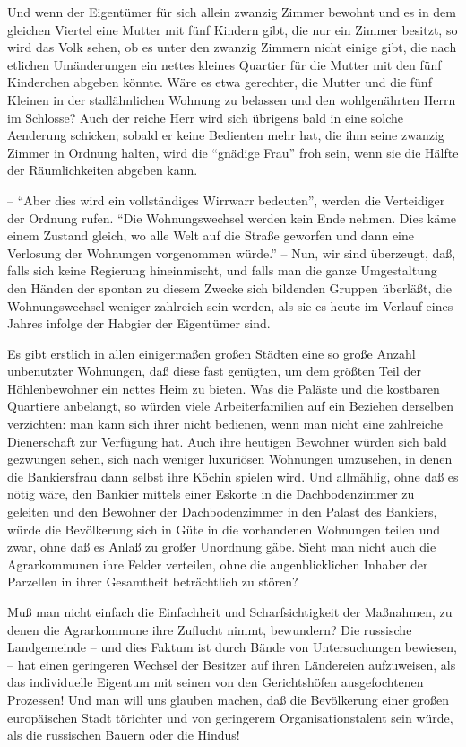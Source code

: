 \documentclass{scrbook}
\begin{document}
Und wenn der Eigentümer für sich allein zwanzig Zimmer bewohnt und es in dem gleichen Viertel eine Mutter mit fünf Kindern gibt, die nur ein Zimmer besitzt, so wird das Volk sehen, ob es unter den zwanzig Zimmern nicht einige gibt, die nach etlichen Umänderungen ein nettes kleines Quartier für die Mutter mit den fünf Kinderchen abgeben könnte. Wäre es etwa gerechter, die Mutter und die fünf Kleinen in der stallähnlichen Wohnung zu belassen und den wohlgenährten Herrn im Schlosse? Auch der reiche Herr wird sich übrigens bald in eine solche Aenderung schicken; sobald er keine Bedienten mehr hat, die ihm seine zwanzig Zimmer in Ordnung halten, wird die ``gnädige Frau'' froh sein, wenn sie die Hälfte der Räumlichkeiten abgeben kann.

– ``Aber dies wird ein vollständiges Wirrwarr bedeuten'', werden die Verteidiger der Ordnung rufen. ``Die Wohnungswechsel werden kein Ende nehmen. Dies käme einem Zustand gleich, wo alle Welt auf die Straße geworfen und dann eine Verlosung der Wohnungen vorgenommen würde.'' – Nun, wir sind überzeugt, daß, falls sich keine Regierung hineinmischt, und falls man die ganze Umgestaltung den Händen der spontan zu diesem Zwecke sich bildenden Gruppen überläßt, die Wohnungswechsel weniger zahlreich sein werden, als sie es heute im Verlauf eines Jahres infolge der Habgier der Eigentümer sind.

Es gibt erstlich in allen einigermaßen großen Städten eine so große Anzahl unbenutzter Wohnungen, daß diese fast genügten, um dem größten Teil der Höhlenbewohner ein nettes Heim zu bieten. Was die Paläste und die kostbaren Quartiere anbelangt, so würden viele Arbeiterfamilien auf ein Beziehen derselben verzichten: man kann sich ihrer nicht bedienen, wenn man nicht eine zahlreiche Dienerschaft zur Verfügung hat. Auch ihre heutigen Bewohner würden sich bald gezwungen sehen, sich nach weniger luxuriösen Wohnungen umzusehen, in denen die Bankiersfrau dann selbst ihre Köchin spielen wird. Und allmählig, ohne daß es nötig wäre, den Bankier mittels einer Eskorte in die Dachbodenzimmer zu geleiten und den Bewohner der Dachbodenzimmer in den Palast des Bankiers, würde die Bevölkerung sich in Güte in die vorhandenen Wohnungen teilen und zwar, ohne daß es Anlaß zu großer Unordnung gäbe. Sieht man nicht auch die Agrarkommunen ihre Felder verteilen, ohne die augenblicklichen Inhaber der Parzellen in ihrer Gesamtheit beträchtlich zu stören?

Muß man nicht einfach die Einfachheit und Scharfsichtigkeit der Maßnahmen, zu denen die Agrarkommune ihre Zuflucht nimmt, bewundern? Die russische Landgemeinde – und dies Faktum ist durch Bände von Untersuchungen bewiesen, – hat einen geringeren Wechsel der Besitzer auf ihren Ländereien aufzuweisen, als das individuelle Eigentum mit seinen von den Gerichtshöfen ausgefochtenen Prozessen! Und man will uns glauben machen, daß die Bevölkerung einer großen europäischen Stadt törichter und von geringerem Organisationstalent sein würde, als die russischen Bauern oder die Hindus!
\end{document}
